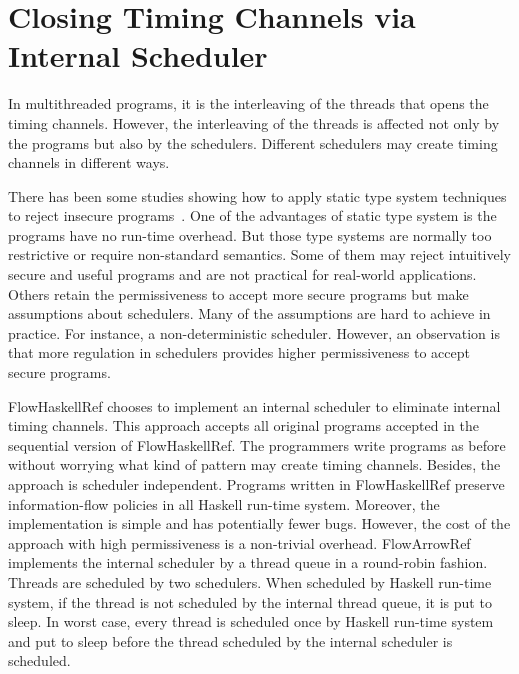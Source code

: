\documentclass{report}
\begin{document}
\section{Closing Timing Channels via Internal Scheduler}
In multithreaded programs, it is the interleaving of the threads that opens the timing channels. 
However, the interleaving of the threads is affected not only by the programs but also by the schedulers.
Different schedulers may create timing channels in different ways.

There has been some studies showing how to apply static type system techniques to reject insecure
programs~\cite{Castellani:Boudol:TCS02,Volpano:Smith:Probabilistic,Zdancewic:Myers:CSFW03}. 
One of the advantages of static type system is the programs have no run-time overhead.
But those type systems are normally too restrictive or require non-standard semantics. 
Some of them may reject intuitively secure and useful programs and are not practical for
real-world applications.
Others retain the permissiveness to accept more secure programs but make assumptions about schedulers. 
Many of the assumptions are hard to achieve in practice. For instance, a non-deterministic scheduler.
However, an observation is that more regulation in schedulers provides higher permissiveness to accept secure
programs.

FlowHaskellRef chooses to implement an internal scheduler to eliminate internal timing channels.
This approach accepts all original programs accepted in the sequential version of FlowHaskellRef. The programmers
write programs as before without worrying what kind of pattern may create timing channels.
Besides, the approach is scheduler independent. Programs written in FlowHaskellRef preserve
information-flow policies in all Haskell run-time system.
Moreover, the implementation is simple and has potentially fewer bugs.
However, the cost of the approach with high permissiveness is a non-trivial overhead. 
FlowArrowRef implements the internal scheduler by a thread queue in a round-robin fashion. 
Threads are scheduled by two schedulers. When scheduled by Haskell run-time system, if
the thread is not scheduled by the internal thread queue, it is put to sleep. 
In worst case, every thread is scheduled once by Haskell run-time system and put to sleep before the thread
scheduled by the internal scheduler is scheduled.
\end{document}
